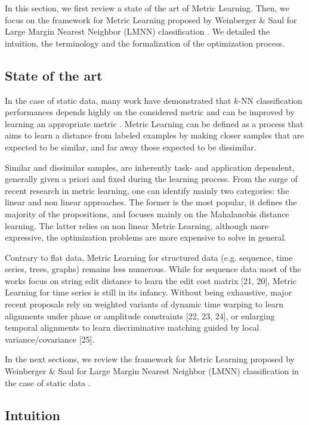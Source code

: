 In this section, we first review a state of the art of Metric Learning. Then, we focus on the framework for Metric Learning proposed by Weinberger \& Saul for Large Margin Nearest Neighbor (LMNN) classification \cite{Weinberger2009}. We detailed the intuition, the terminology and the formalization of the optimization process.

\subsection{State of the art}
In the case of static data, many work have demonstrated that $k$-NN classification performances depends highly on the considered metric and can be improved by learning an appropriate metric \cite{Shental2002,Goldberger2004,Chopra2005}. Metric Learning can be defined as a process that aims to learn a distance from labeled examples by making closer samples that are expected to be similar, and far away those expected to be dissimilar.

 Similar and dissimilar samples, are inherently task- and application dependent, generally given a priori and fixed during the learning process. From the surge of recent research in metric learning, one can identify mainly two categories: the linear and non linear approaches. The former is the most popular, it defines the majority of the propositions, and focuses mainly on the Mahalanobis distance learning. The latter relies on non linear Metric Learning, although more expressive, the optimization problems are more expensive to solve in general.

Contrary to flat data, Metric Learning for structured data (e.g. sequence, time series, trees, graphs) remains less numerous. While for sequence data most of the works focus on string edit
distance to learn the edit cost matrix [21, 20], Metric Learning for time series is still in its infancy. Without being exhaustive, major recent proposals rely on weighted variants of dynamic time warping to learn alignments under phase or amplitude constraints [22, 23, 24], or enlarging temporal alignments to learn discriminative matching guided by local variance/covariance [25].

In the next sections, we review the framework for Metric Learning proposed by Weinberger \& Saul for Large Margin Nearest Neighbor (LMNN) classification in the case of static data \cite{Weinberger2009}. 



\subsection{Intuition}

